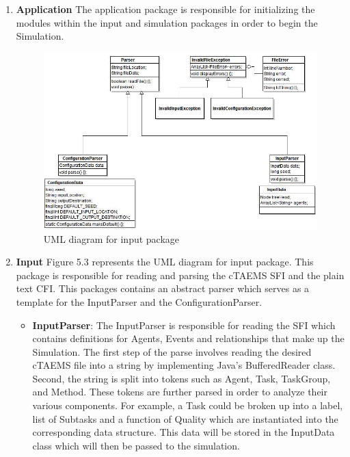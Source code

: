 \begin{enumerate}

\item \textbf{Application}  The application package is responsible for initializing the modules within the input and simulation packages in order to begin the Simulation.

\begin{figure}[htb]
\centering
\includegraphics[width=5.0in]{figs/input}
\caption{UML diagram for input package}
\label{fig:input}
\end{figure}

\item \textbf{Input} Figure 5.3 represents the UML diagram for input package. This package is responsible for reading and parsing the cTAEMS SFI and the plain text CFI. This packages contains an abstract parser which serves as a template for the InputParser and the ConfigurationParser. \\

\begin{itemize}
\item \textbf{InputParser}: The InputParser is responsible for reading the SFI which contains definitions for Agents, Events and relationships that make up the Simulation. The first step of the parse involves reading the desired cTAEMS file into a string by implementing Java's BufferedReader class. Second, the string is split into tokens such as Agent, Task, TaskGroup, and Method. These tokens are further parsed in order to analyze their various components. For example, a Task could be broken up into a label, list of Subtasks and a function of Quality which are instantiated into the corresponding data structure. This data will be stored in the InputData class which will then be passed to the simulation. \\


\end{itemize}
\end{enumerate}
